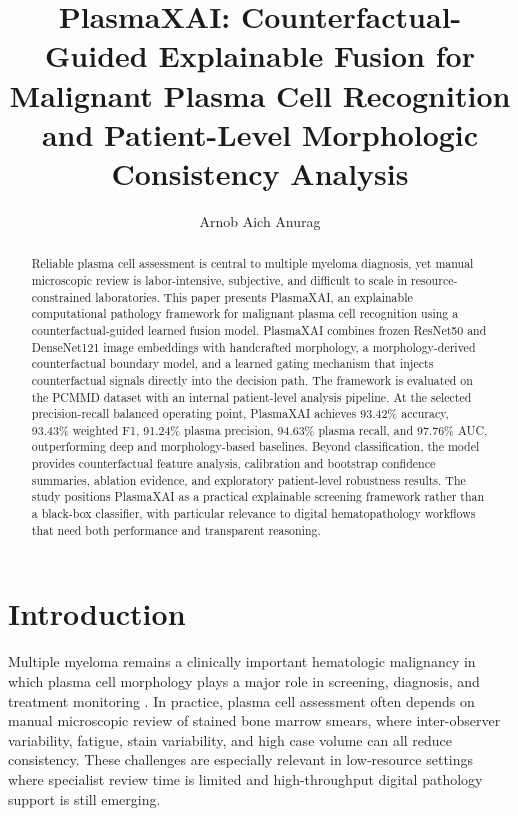 \documentclass[runningheads]{llncs}
\begin{document}
\title{PlasmaXAI: Counterfactual-Guided Explainable Fusion for Malignant Plasma Cell Recognition and Patient-Level Morphologic Consistency Analysis}
\author{Arnob Aich Anurag}

\maketitle
\thispagestyle{plain}

\begin{abstract}
Reliable plasma cell assessment is central to multiple myeloma diagnosis, yet manual microscopic review is labor-intensive, subjective, and difficult to scale in resource-constrained laboratories. This paper presents PlasmaXAI, an explainable computational pathology framework for malignant plasma cell recognition using a counterfactual-guided learned fusion model. PlasmaXAI combines frozen ResNet50 and DenseNet121 image embeddings with handcrafted morphology, a morphology-derived counterfactual boundary model, and a learned gating mechanism that injects counterfactual signals directly into the decision path. The framework is evaluated on the PCMMD dataset with an internal patient-level analysis pipeline. At the selected precision-recall balanced operating point, PlasmaXAI achieves 93.42\% accuracy, 93.43\% weighted F1, 91.24\% plasma precision, 94.63\% plasma recall, and 97.76\% AUC, outperforming deep and morphology-based baselines. Beyond classification, the model provides counterfactual feature analysis, calibration and bootstrap confidence summaries, ablation evidence, and exploratory patient-level robustness results. The study positions PlasmaXAI as a practical explainable screening framework rather than a black-box classifier, with particular relevance to digital hematopathology workflows that need both performance and transparent reasoning.
\end{abstract}

\section{Introduction}
Multiple myeloma remains a clinically important hematologic malignancy in which plasma cell morphology plays a major role in screening, diagnosis, and treatment monitoring \cite{mmreview}. In practice, plasma cell assessment often depends on manual microscopic review of stained bone marrow smears, where inter-observer variability, fatigue, stain variability, and high case volume can all reduce consistency. These challenges are especially relevant in low-resource settings where specialist review time is limited and high-throughput digital pathology support is still emerging.
\end{document}
